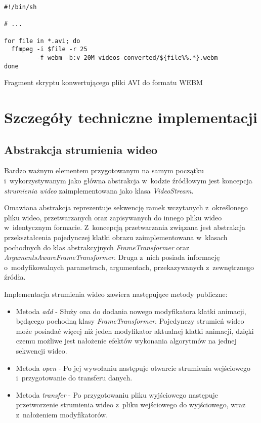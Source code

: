       \begin{sample}[ht]
        \begin{verbatim}
#!/bin/sh

# ...

for file in *.avi; do
  ffmpeg -i $file -r 25
         -f webm -b:v 20M videos-converted/${file%%.*}.webm
done
        \end{verbatim}
        \caption{Fragment skryptu konwertującego pliki AVI do formatu WEBM}
        \label{UtilityScript}
      \end{sample}

  \section{Szczegóły techniczne implementacji}\label{Section_ImplementationDetails}

  \subsection{Abstrakcja strumienia wideo}\label{Subsection_VideoStream}
  Bardzo ważnym elementem przygotowanym na samym początku i~wykorzystywanym jako główna abstrakcja w~kodzie źródłowym jest koncepcja \textit{strumienia wideo} zaimplementowana jako klasa \textit{VideoStream}.

  Omawiana abstrakcja reprezentuje sekwencję ramek wczytanych z~określonego pliku wideo, przetwarzanych oraz zapisywanych do innego pliku wideo w~identycznym formacie. Z~koncepcją przetwarzania związana jest abstrakcja przekształcenia pojedynczej klatki obrazu zaimplementowana w~klasach pochodnych do klas abstrakcyjnych \textit{FrameTransformer} oraz \textit{ArgumentsAwareFrameTransformer}. Druga z~nich posiada informację o~modyfikowalnych parametrach, argumentach, przekazywanych z~zewnętrznego źródła.

  Implementacja strumienia wideo zawiera następujące metody publiczne:
  \begin{itemize}
    \item Metoda \textit{add} - Służy ona do dodania nowego modyfikatora klatki animacji, będącego pochodną klasy \textit{FrameTransformer}. Pojedynczy strumień wideo może posiadać więcej niż jeden modyfikator aktualnej klatki animacji, dzięki czemu możliwe jest nałożenie efektów wykonania algorytmów na jednej sekwencji wideo.
    \item Metoda \textit{open} - Po jej wywołaniu następuje otwarcie strumienia wejściowego i~przygotowanie do transferu danych.
    \item Metoda \textit{transfer} - Po przygotowaniu pliku wyjściowego następuje przetworzenie strumienia wideo z~pliku wejściowego do wyjściowego, wraz z~nałożeniem modyfikatorów.
  \end{itemize}

